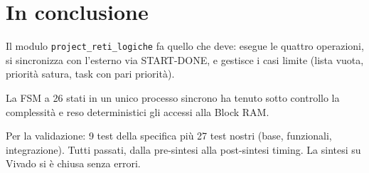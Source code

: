 \documentclass[a4paper,12pt]{article}
\begin{document}
\section{In conclusione}

Il modulo \texttt{project\_reti\_logiche} fa quello che deve: esegue le quattro operazioni, si sincronizza con l'esterno via START-DONE, e gestisce i casi limite (lista vuota, priorità satura, task con pari priorità).

La FSM a 26 stati in un unico processo sincrono ha tenuto sotto controllo la complessità e reso deterministici gli accessi alla Block RAM.

Per la validazione: 9 test della specifica più 27 test nostri (base, funzionali, integrazione). Tutti passati, dalla pre-sintesi alla post-sintesi timing. La sintesi su Vivado si è chiusa senza errori.
\end{document}
